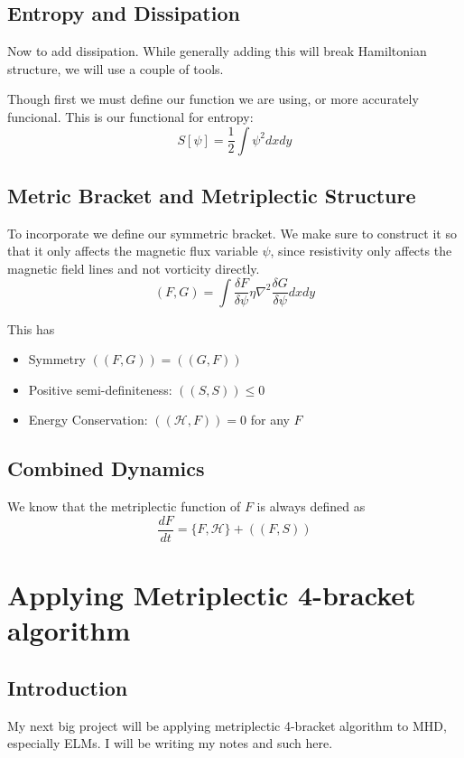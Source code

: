 \subsection{Entropy and Dissipation}
\par Now to add dissipation. While generally adding this will break Hamiltonian structure, we will use a couple of tools. 
\par Though first we must define our function we are using, or more accurately funcional. This is our functional for entropy:
$$S[\psi]=\frac{1}2 \int \psi^2dxdy$$
\subsection{Metric Bracket and Metriplectic Structure}
\par To incorporate we define our symmetric bracket. We make sure to construct it so that it only affects the magnetic flux variable $\psi$, since resistivity only affects the magnetic field lines and not vorticity directly.
$$(F,G)=\int 
\frac{\delta F}{\delta \psi}\eta \nabla^2 \frac{\delta G}{\delta \psi}dxdy$$
\par This has 
\begin{itemize}
    \item Symmetry $((F,G))=((G,F))$
    \item Positive semi-definiteness: $((S,S))\leq0$
    \item Energy Conservation: $((\mathcal{H}, F))=0$ for any $F$
\end{itemize}
\subsection{Combined Dynamics}
\par We know that the metriplectic function of $F$ is always defined as
$$\frac{dF}{dt}= \{F, \mathcal H \}+ ((F, S))$$
\section{Applying Metriplectic 4-bracket algorithm}
\subsection{Introduction}
\par My next big project will be applying metriplectic 4-bracket algorithm to MHD, especially ELMs. I will be writing my notes and such here.

